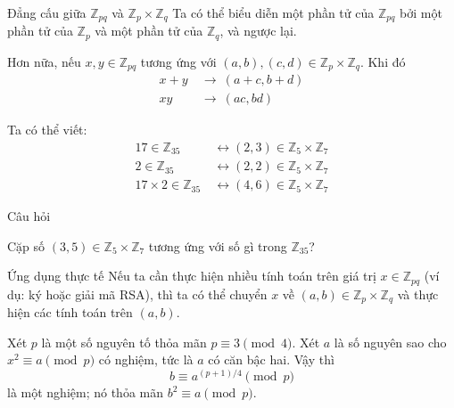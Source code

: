 \begin{frame}[t]{Đẳng cấu giữa $\mathbb{Z}_{pq}$ và $\mathbb{Z}_{p} \times \mathbb{Z}_q$}
	Ta có thể biểu diễn một phần tử của $\mathbb{Z}_{pq}$ bởi một phần tử của $\mathbb{Z}_p$ và một phần tử của $\mathbb{Z}_q$, và ngược lại.
	\bigskip
	
	Hơn nữa, nếu $x,y \in \mathbb{Z}_{pq}$ tương ứng với  $(a,b), (c,d) \in \mathbb{Z}_p\times \mathbb{Z}_q$. Khi đó 
\begin{align*}
	x+y\ &\rightarrow\ (a+c, b+d) \\
	xy\  &\rightarrow\ (ac, bd)
\end{align*}
\begin{xmpl} Ta có thể viết: 
	\begin{align*}
		17 \in \mathbb{Z}_{35} &\longleftrightarrow (2,3) \in \mathbb{Z}_{5}\times \mathbb{Z}_{7} \\
		2 \in \mathbb{Z}_{35}   &\longleftrightarrow (2,2) \in \mathbb{Z}_{5}\times \mathbb{Z}_{7}\\
		17 \times 2 \in \mathbb{Z}_{35}\ &\longleftrightarrow (4,6) \in \mathbb{Z}_{5}\times \mathbb{Z}_{7}
	\end{align*}
\end{xmpl}
	
\end{frame}

\begin{frame}{Câu hỏi}
	\begin{xrcs}
	Cặp số $(3,5)\in \mathbb{Z}_{5}\times \mathbb{Z}_{7}$ tương ứng với số gì trong $\mathbb{Z}_{35}$?		
	\end{xrcs}
\end{frame}

\begin{frame}{Ứng dụng thực tế}
	Nếu ta cần thực hiện nhiều tính toán trên giá trị $x \in \mathbb{Z}_{pq}$ (ví dụ: ký hoặc giải mã RSA), thì ta có thể chuyển $x$ về $(a,b) \in \mathbb{Z}_{p}\times \mathbb{Z}_{q}$ và thực hiện các tính toán trên $(a,b)$.
\end{frame}
\begin{frame}
	\begin{prpstn}
		Xét $p$ là một số nguyên tố thỏa mãn $p \equiv 3 \pmod{4}$. Xét $a$ là số nguyên sao cho $x^2 \equiv a \pmod{p}$ có nghiệm, tức là $a$ có căn bậc hai. Vậy thì 
		$$
		b \equiv a^{(p+1)/4} \pmod{p}
		$$
		là một nghiệm; nó thỏa mãn $b^2 \equiv a \pmod{p}$. 
	\end{prpstn}
\end{frame}

